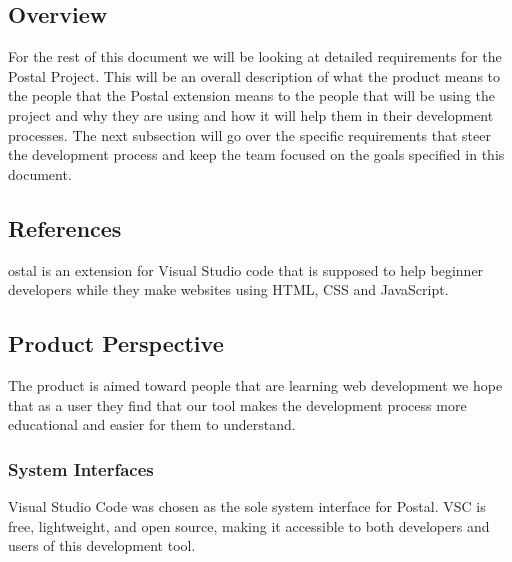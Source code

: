 \documentclass[letterpaper,10pt,titlepage,draftclsnofoot,onecolumn,onesided] {IEEEtran}
\begin{document}

\begingroup
\renewcommand{\section}[2]{\subsection{References}}


\endgroup

\subsection{Overview}
For the rest of this document we will be looking at detailed requirements for the Postal Project. 
This will be an overall description of what the product means to the people that the Postal extension means to the people that will be using the project and why they are using and how it will help them in their development processes. 
The next subsection will go over the specific requirements that steer the development process and keep the team focused on the goals specified in this document.   

\section{Overall Description}
Postal is an extension for Visual Studio code  that is supposed to help beginner developers while they make websites using HTML, CSS and JavaScript. 

\subsection{Product Perspective}
The product is aimed toward people that are learning web development we hope that as a user they find that our tool makes the development process more educational and easier for them to understand.

\subsubsection{System Interfaces}
Visual Studio Code was chosen as the sole system interface for Postal.
VSC is free, lightweight, and open source, making it accessible to both developers and users of this development tool.
\end{document}

